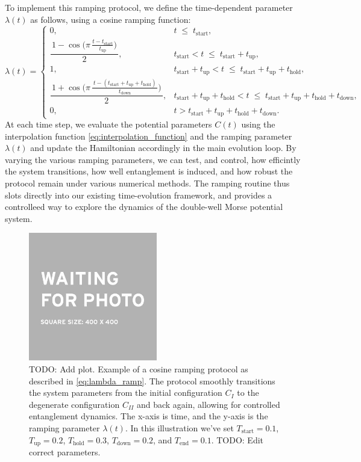 \documentclass{subfiles}
\begin{document}
To implement this ramping protocol, we define the time-dependent parameter $\lambda(t)$ as follows, using a cosine ramping function:
\begin{equation*}
\lambda(t)=
\begin{cases}
0,
&
t \;\le\;
t_{\mathrm{start}},
\\[6pt]
\dfrac{\,1-\cos\!\bigl(\pi\,\tfrac{t - t_{\mathrm{start}}}{t_{\mathrm{up}}}\bigr)\,}{2},
&
t_{\mathrm{start}} < t \;\le\; t_{\mathrm{start}} + t_{\mathrm{up}},
\\[8pt]
1,
&
t_{\mathrm{start}} + t_{\mathrm{up}} < t \;\le\;
t_{\mathrm{start}} + t_{\mathrm{up}} + t_{\mathrm{hold}},
\\[6pt]
\dfrac{\,1+\cos\!\bigl(\pi\,\tfrac{\,t - (t_{\mathrm{start}}+t_{\mathrm{up}}+t_{\mathrm{hold}})\,}{t_{\mathrm{down}}}\bigr)\,}{2},
&
t_{\mathrm{start}} + t_{\mathrm{up}} + t_{\mathrm{hold}}
< t \;\le\;
t_{\mathrm{start}} + t_{\mathrm{up}} + t_{\mathrm{hold}} + t_{\mathrm{down}},
\\[6pt]
0,
&
t > t_{\mathrm{start}} + t_{\mathrm{up}} + t_{\mathrm{hold}} + t_{\mathrm{down}}.
\end{cases}
\label{eq:lambda_ramp}
\end{equation*}
At each time step, we evaluate the potential parameters $C(t)$ using the interpolation function \eqref{eq:interpolation_function} and the ramping parameter $\lambda(t)$ and update the Hamiltonian accordingly in the main evolution loop. By varying the various ramping parameters, we can test, and control, how efficintly the system transitions, how well entanglement is induced, and how robust the protocol remain under various numerical methods. The ramping routine thus slots directly into our existing time-evolution framework, and provides a controlleed way to explore the dynamics of the double-well Morse potential system.
\begin{figure}[h!]
    \centering
    \includegraphics[width=0.5\textwidth]{figs/placeholder_image.jpeg}
    \caption{TODO: Add plot. Example of a cosine ramping protocol as described in \eqref{eq:lambda_ramp}. The protocol smoothly transitions the system parameters from the initial configuration $C_I$ to the degenerate configuration $C_{II}$ and back again, allowing for controlled entanglement dynamics. The x-axis is time, and the y-axis is the ramping parameter $\lambda(t)$. In this illustration we've set $T_{\mathrm{start}} = 0.1$, $T_{\mathrm{up}} = 0.2$, $T_{\mathrm{hold}} = 0.3$, $T_{\mathrm{down}} = 0.2$, and $T_{\mathrm{end}} = 0.1$. TODO: Edit correct parameters.}
\end{figure}
\end{document}
